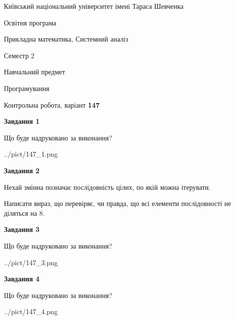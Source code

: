 \documentclass[12pt, ukrainian]{article}
\begin{document}
{{\begin {small}\par
{ \center  Київський національний університет імені Тараса Шевченка \par}
{\parbox {5 cm}{Освітня програма \hfill}{\parbox {8 cm}{Прикладна математика, Системний аналіз \hfill}}\parbox {5 cm}{\hfill Семестр 2}}\par
{\parbox {5 cm} {Навчальний предмет \hfill}\parbox {7 cm}{Програмування \hfill}\parbox {6cm}{\hfill}\par}\vspace{-7pt} \end{small}}{\center Контрольна робота, варіант  \No \textbf
{ 147 }\par}}
{
\begin {large}
{\begin {center}\textbf{Завдання 1}\end {center}}\par
Що буде надруковано за виконання?\par\par
\begin{center}
	{../pict/147_1.png}
\end{center}
\newpage

{\begin {center}\textbf{Завдання 2}\end {center}}\par
Нехай змінна  позначає послідовність цілих, по якій можна ітерувати.

Написати вираз, що перевіряє, чи правда, що всі елементи послідовності не діляться на 8.\par
\newpage

{\begin {center}\textbf{Завдання 3}\end {center}}\par
Що буде надруковано за виконання?
\begin{center}
	{../pict/147_3.png}
\end{center}
\newpage

{\begin {center}\textbf{Завдання 4}\end {center}}\par
Що буде надруковано за виконання?\par
\begin{center}
	{../pict/147_4.png}
\end{center}
\newpage


\end{large}}
\end{document}
